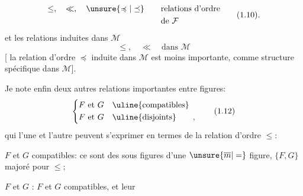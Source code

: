 \[
\begin{aligned}
\leq,\quad\ll,\quad\unsure{\preccurlyeq|\preceq}&\qquad\text{relations d'ordre}\\
&\qquad\text{de }\mathcal{F}
\end{aligned}\tag*{(1.10).}
\]
et les relations induites dans $\mathcal{M}$
\[
\leq,\quad\ll\quad\text{dans }\mathcal{M}\tag*{(1.11)}
\]
[ la relation d'ordre $\preccurlyeq$ induite dans $\mathcal{M}$ est moins importante, comme structure spécifique dans $\mathcal{M}$].


Je note enfin deux autres relations importantes  entre figures:
\[
\left\{\begin{aligned}
F\text{ et }G&\quad\text{\uline{compatibles}}\\
F\text{ et }G&\quad\text{\uline{disjoints}}\qquad,
\end{aligned}\right.\tag*{(1.12)}
\]
qui l'une et l'autre peuvent s'exprimer en termes de la relation d'ordre $\leq$:

$F$ et $G$ compatibles: ce sont des sous figures d'une $\unsure{\overline m|=}$ figure,  $\{F,G\}$ majoré pour $\leq$;

$F$ et $G$ : $F$ et $G$ compatibles, et leur
